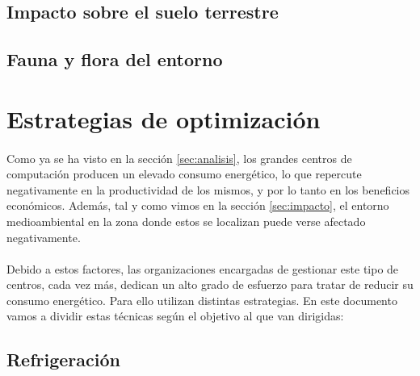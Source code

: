 \documentclass[10pt]{article}
\begin{document}
        \subsection{Impacto sobre el suelo terrestre}
        	\paragraph{}
            
        \subsection{Fauna y flora del entorno}
        	\paragraph{}
            
        
            
            

    \section{Estrategias de optimización}
	\label{sec:estrategias}

    	\paragraph{}
		Como ya se ha visto en la sección \ref{sec:analisis}, los grandes centros de computación producen un elevado consumo energético, lo que repercute negativamente en la productividad de los mismos, y por lo tanto en los beneficios económicos. Además, tal y como vimos en la sección \ref{sec:impacto}, el entorno medioambiental en la zona donde estos se localizan puede verse afectado negativamente.


		\paragraph{}
		Debido a estos factores, las organizaciones encargadas de gestionar este tipo de centros, cada vez más, dedican un alto grado de esfuerzo para tratar de reducir su consumo energético. Para ello utilizan distintas estrategias. En este documento vamos a dividir estas técnicas según el objetivo al que van dirigidas:


		\subsection{Refrigeración}
\end{document}
